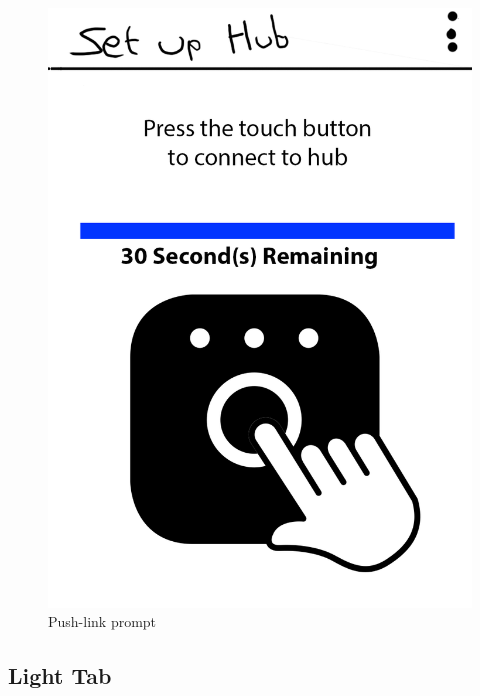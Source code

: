 \begin{figure}
 \centering
  \includegraphics[scale=0.2]{Images/designs/AppDesign_03.png}
  \caption{Push-link prompt}
\end{figure}


\subsection{Light Tab}

